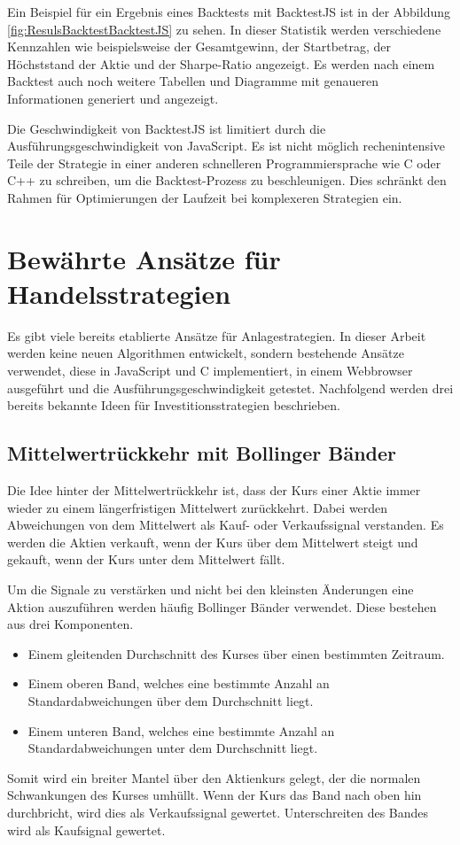 Ein Beispiel für ein Ergebnis eines Backtests mit BacktestJS ist in der Abbildung \ref{fig:ResulsBacktestBacktestJS} zu sehen.
In dieser Statistik werden verschiedene Kennzahlen wie beispielsweise der Gesamtgewinn, der Startbetrag, der Höchststand der Aktie und der Sharpe-Ratio angezeigt.
Es werden nach einem Backtest auch noch weitere Tabellen und Diagramme mit genaueren Informationen generiert und angezeigt.

Die Geschwindigkeit von BacktestJS ist limitiert durch die Ausführungsgeschwindigkeit von JavaScript. 
Es ist nicht möglich rechenintensive Teile der Strategie in einer anderen schnelleren Programmiersprache wie C oder C++ zu schreiben, um die Backtest-Prozess zu beschleunigen.
Dies schränkt den Rahmen für Optimierungen der Laufzeit bei komplexeren Strategien ein.

\section{Bewährte Ansätze für Handelsstrategien}
\label{sec:Bewährte AnsätzefürHandelsstrategien}

Es gibt viele bereits etablierte Ansätze für Anlagestrategien. In dieser Arbeit werden keine neuen Algorithmen entwickelt, sondern bestehende Ansätze verwendet, diese in JavaScript und C implementiert, in einem Webbrowser ausgeführt und die Ausführungsgeschwindigkeit getestet.
Nachfolgend werden drei bereits bekannte Ideen für Investitionsstrategien beschrieben.

\subsection{Mittelwertrückkehr mit Bollinger Bänder}
\label{subsec:MittelwertrückkehrmitBollingerBänder}

Die Idee hinter der Mittelwertrückkehr ist, dass der Kurs einer Aktie immer wieder zu einem längerfristigen Mittelwert zurückkehrt. Dabei werden Abweichungen von dem Mittelwert als Kauf- oder Verkaufssignal verstanden.
Es werden die Aktien verkauft, wenn der Kurs über dem Mittelwert steigt und gekauft, wenn der Kurs unter dem Mittelwert fällt.
\cite{martin2011meanreversionpayscosts}

Um die Signale zu verstärken und nicht bei den kleinsten Änderungen eine Aktion auszuführen werden häufig Bollinger Bänder verwendet. 
Diese bestehen aus drei Komponenten. 
\begin{itemize}
    \item Einem gleitenden Durchschnitt des Kurses über einen bestimmten Zeitraum.
    \item Einem oberen Band, welches eine bestimmte Anzahl an Standardabweichungen über dem Durchschnitt liegt.
    \item Einem unteren Band, welches eine bestimmte Anzahl an Standardabweichungen unter dem Durchschnitt liegt.
\end{itemize}
Somit wird ein breiter Mantel über den Aktienkurs gelegt, der die normalen Schwankungen des Kurses umhüllt.
Wenn der Kurs das Band nach oben hin durchbricht, wird dies als Verkaufssignal gewertet. Unterschreiten des Bandes wird als Kaufsignal gewertet.
\cite{bollinger1992using} \cite{Su2023} \cite{leeds2013bollingerbandsthirtyyears}

